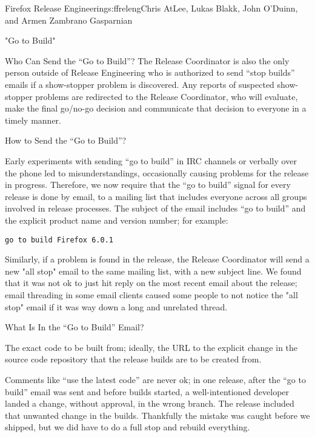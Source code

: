 \begin{aosachapter}{Firefox Release Engineering}{s:ffreleng}{Chris AtLee, Lukas Blakk, John O'Duinn, and Armen Zambrano Gasparnian}
\begin{aosasect1}{"Go to Build"}
\begin{aosasect2}{Who Can Send the ``Go to Build''?}
The Release Coordinator is also the only person outside of Release
Engineering who is authorized to send ``stop builds'' emails if a
show-stopper problem is discovered. Any reports of
suspected show-stopper problems are redirected to the Release
Coordinator, who will evaluate, make the final go/no-go decision and
communicate that decision to everyone in a timely manner.

\end{aosasect2}

\begin{aosasect2}{How to Send the ``Go to Build''?}

Early experiments with sending ``go to build'' in IRC channels or
verbally over the phone led to misunderstandings,
occasionally causing problems for the release in progress. Therefore,
we now require that the ``go to build'' signal for every release is
done by email, to a mailing list that includes everyone across all
groups involved in release processes. The subject of the email
includes ``go to build'' and the explicit product name and version
number; for example:

\begin{verbatim}
go to build Firefox 6.0.1
\end{verbatim}

Similarly, if a problem is found in the release, the Release
Coordinator will send a new "all stop" email to the same mailing list,
with a new subject line. We found that it was not ok to just hit reply
on the most recent email about the release; email threading in some
email clients caused some people to not notice the "all stop" email if
it was way down a long and unrelated thread.

\end{aosasect2}

\begin{aosasect2}{What Is In the ``Go to Build'' Email?}

\begin{aosaenumerate}

\item The exact code to be built from; ideally, the URL to the
explicit change in the source code repository that the release builds are
to be created from.

  \begin{aosaenumerate2}

    \item Comments like ``use the latest code'' are never ok; in one
      release, after the ``go to build'' email was sent and before
      builds started, a well-intentioned developer landed a change,
      without approval, in the wrong branch. The release included that
      unwanted change in the builds. Thankfully the mistake was
      caught before we shipped, but we did have to do a full stop and
      rebuild everything.


\end{aosaenumerate2}
\end{aosaenumerate}
\end{aosasect2}
\end{aosasect1}
\end{aosachapter}
